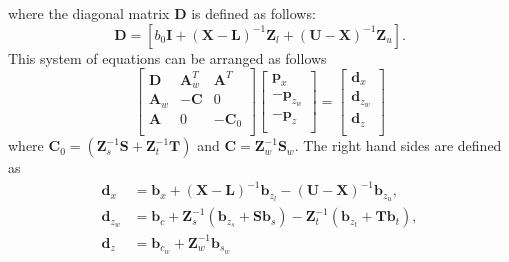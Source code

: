 \documentclass[12pt]{article}
\newcommand{\mb}{\mathbf}
\begin{document}
where the diagonal matrix $\mb{D}$ is defined as follows:
\begin{equation*}
  \mb{D} = \left[ b_{0} \mb{I} + (\mb{X} - \mb{L})^{-1}\mb{Z}_{l} + (\mb{U} - \mb{X})^{-1}\mb{Z}_{u} \right].
\end{equation*}
%
This system of equations can be arranged as follows
\begin{equation}
\label{eqn:kkt-reduced}
\begin{bmatrix} 
\mb{D} & \mb{A}_{w}^{T} & \mb{A}^{T} \\
\mb{A}_{w} & -\mb{C} & 0 \\
\mb{A} & 0 & - \mb{C}_{0} \\
\end{bmatrix}
\begin{bmatrix}
\mb{p}_{x} \\
- \mb{p}_{z_{w}} \\
- \mb{p}_{z} \\
\end{bmatrix} =
\begin{bmatrix}
\mb{d}_{x} \\
\mb{d}_{z_{w}} \\
\mb{d}_{z} \\
\end{bmatrix}
\end{equation}
%
where $\mb{C}_{0} = (\mb{Z}_{s}^{-1}\mb{S} + \mb{Z}_{t}^{-1}\mb{T})$ and $\mb{C} =  \mb{Z}_{w}^{-1}\mb{S}_{w}$.
The right hand sides are defined as
\begin{equation*}
\begin{aligned}
\mb{d}_{x} &= \mb{b}_{x} + (\mb{X} - \mb{L})^{-1}\mb{b}_{z_{l}} - (\mb{U} - \mb{X})^{-1}\mb{b}_{z_{u}}, \\
\mb{d}_{z_{w}} &=  \mb{b}_{c} + \mb{Z}_{s}^{-1}(\mb{b}_{z_{s}} + \mb{S}\mb{b}_{s}) - \mb{Z}_{t}^{-1}(\mb{b}_{z_{t}} + \mb{T}\mb{b}_{t}), \\
\mb{d}_{z} &=  \mb{b}_{c_{w}} + \mb{Z}_{w}^{-1}\mb{b}_{s_{w}} \\
\end{aligned}
\end{equation*}
\end{document}
